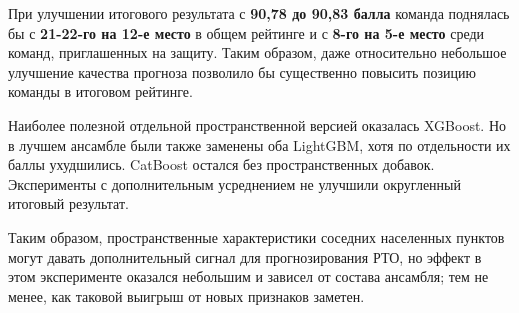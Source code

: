 \documentclass[12pt, a4paper]{article}
\begin{document}
При улучшении итогового результата с \textbf{90,78 до 90,83 балла} команда поднялась бы с \textbf{21-22-го на 12-е место}
в общем рейтинге и с \textbf{8-го на 5-е место} среди команд, приглашенных на защиту.
Таким образом, даже относительно небольшое улучшение качества прогноза позволило бы существенно повысить позицию команды в
итоговом рейтинге.

Наиболее полезной отдельной пространственной версией оказалась XGBoost. Но в лучшем ансамбле были также заменены
оба LightGBM, хотя по отдельности их баллы ухудшились. CatBoost остался без пространственных добавок. Эксперименты
с дополнительным усреднением не улучшили округленный итоговый результат.

Таким образом, пространственные характеристики соседних населенных пунктов могут давать дополнительный сигнал для прогнозирования РТО,
но эффект в этом эксперименте оказался небольшим и зависел от состава ансамбля; тем не менее, как таковой выигрыш от новых признаков заметен.

\clearpage
\end{document}
